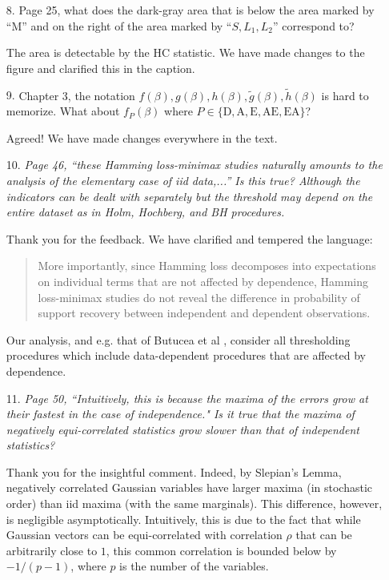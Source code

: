 \documentclass[11pt]{article}
\begin{document}
\medskip
{}
\begin{itemize}
	\item [8.] {Page 25, what does the dark-gray area that is below the area marked by
	``M'' and on the right of the area marked by ``$S, L_1 , L_2$'' correspond to?}
    
    The area is detectable by the HC statistic. We have made changes to the figure and clarified this in the caption.
	
	\item [9.] {Chapter 3, the notation $f(\beta), g(\beta), h(\beta), \widetilde{g}(\beta), \widetilde{h}(\beta)$ is hard to memorize. What about $f_P(\beta)$ where $P\in\{\mathrm{D, A, E, AE, EA}\}$?}
	
	Agreed! We have made changes everywhere in the text.
	
	 \item [10.] {\em Page 46, ``these Hamming loss-minimax studies naturally amounts to the analysis of the elementary case of iid data,...'' 
	 Is this true? Although the indicators can be dealt with separately but the threshold may depend on the entire dataset as in Holm, 
	 Hochberg, and BH procedures. }
	 
	Thank you for the feedback. We have clarified and tempered the language:
	\begin{quote}
	 More importantly, since Hamming loss decomposes into expectations on individual terms that are not affected by dependence, Hamming loss-minimax studies do not reveal the difference in probability of support recovery between independent and dependent observations. 
	\end{quote}
	Our analysis, and e.g. that of Butucea et al \citep{butucea2018variable}, consider all thresholding procedures which include data-dependent procedures that are affected by dependence.
	 
	\item[11.]{\em Page 50, ``Intuitively, this is because the maxima of the errors grow at their fastest in the case of independence." Is it true that the maxima of negatively equi-correlated statistics grow slower than that of independent statistics?}
 
    Thank you for the insightful comment.  Indeed, by Slepian's Lemma, negatively correlated Gaussian variables have larger maxima (in stochastic order)
    than iid maxima (with the same marginals).  This difference, however, is negligible asymptotically.  Intuitively, this is due to the fact that while Gaussian vectors can be equi-correlated with correlation $\rho$ that can be arbitrarily close to $1$, this common correlation is bounded below by $-1/(p-1)$, where $p$ is the number of the variables. 
  

\end{itemize}
\end{document}
